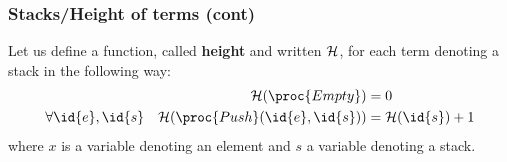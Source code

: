 %
\begin{frame}
\frametitle{Stacks/Height of terms (cont)} 

Let us define a function, called \textbf{height} and written \({\cal
 H}\), for each term denoting a stack in the following way:
\[
\begin{aligned}
&                       &    {\cal H} (\proc{Empty}) 
                          &= 0\\
&\forall \id{e}, \id{s} &    {\cal H} (\proc{Push} (\id{e}, \id{s}))
                          &= {\cal H} (\id{s}) + 1
\end{aligned}
\]
where \(x\) is a variable denoting an element and \(s\) a variable
denoting a stack.

\end{frame}
